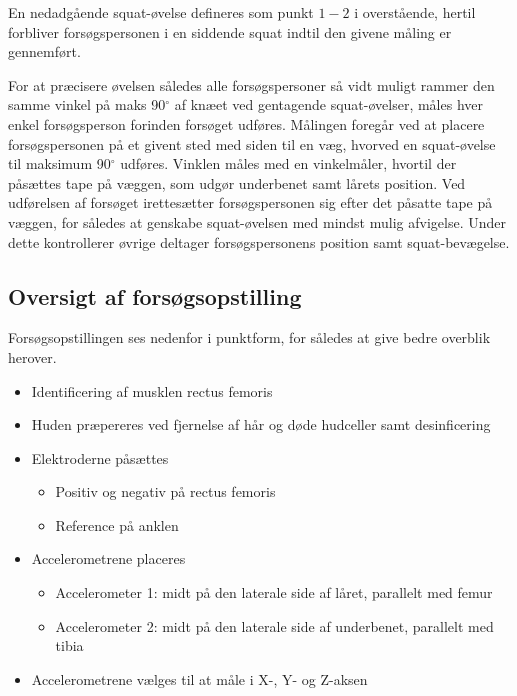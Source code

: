 En nedadgående squat-øvelse defineres som punkt $1-2$ i overstående, hertil forbliver forsøgspersonen i en siddende squat indtil den givene måling er gennemført.

For at præcisere øvelsen således alle forsøgspersoner så vidt muligt rammer den samme vinkel på maks  90$^{\circ}$ af knæet ved gentagende squat-øvelser, måles hver enkel forsøgsperson forinden forsøget udføres. Målingen foregår ved at placere forsøgspersonen på et givent sted med siden til en væg, hvorved en squat-øvelse til maksimum 90$^{\circ}$ udføres. Vinklen måles med en vinkelmåler, hvortil der påsættes tape på væggen, som udgør underbenet samt lårets position.
Ved udførelsen af forsøget irettesætter forsøgspersonen sig efter det påsatte tape på væggen, for således at genskabe squat-øvelsen med mindst mulig afvigelse. Under dette kontrollerer øvrige deltager forsøgspersonens position samt squat-bevægelse.



\subsection{Oversigt af forsøgsopstilling}
Forsøgsopstillingen ses nedenfor i punktform, for således at give bedre overblik herover. 

\begin{itemize}
\item Identificering af musklen rectus femoris %
\item Huden præpereres ved fjernelse af hår og døde hudceller samt desinficering 
\item Elektroderne påsættes
	\begin{itemize}
	\item Positiv og negativ på rectus femoris
	\item Reference på anklen
	\end{itemize} 
\item Accelerometrene placeres 
	\begin{itemize}
	\item Accelerometer 1: midt på den laterale side af låret, parallelt med femur
	\item Accelerometer 2: midt på den laterale side af underbenet, parallelt med tibia 
	\end{itemize}
\item Accelerometrene vælges til at måle i X-, Y- og Z-aksen
\end{itemize}

